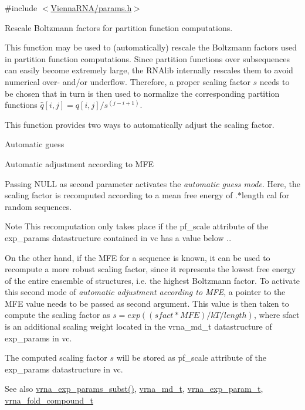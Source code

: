 {\ttfamily \#include $<$\hyperlink{params_8h}{Vienna\+R\+N\+A/params.\+h}$>$}



Rescale Boltzmann factors for partition function computations. 

This function may be used to (automatically) rescale the Boltzmann factors used in partition function computations. Since partition functions over subsequences can easily become extremely large, the R\+N\+Alib internally rescales them to avoid numerical over-\/ and/or underflow. Therefore, a proper scaling factor $s$ needs to be chosen that in turn is then used to normalize the corresponding partition functions $\hat{q}[i,j] = q[i,j] / s^{(j-i+1)}$.

This function provides two ways to automatically adjust the scaling factor.
\begin{DoxyEnumerate}
\item Automatic guess
\item Automatic adjustment according to M\+F\+E
\end{DoxyEnumerate}

Passing {\ttfamily N\+U\+L\+L} as second parameter activates the {\itshape automatic guess mode}. Here, the scaling factor is recomputed according to a mean free energy of {.$\ast$length} cal for random sequences. \begin{DoxyNote}{Note}
This recomputation only takes place if the {\ttfamily pf\+\_\+scale} attribute of the {\ttfamily exp\+\_\+params} datastructure contained in {\ttfamily vc} has a value below {.}.
\end{DoxyNote}
On the other hand, if the M\+F\+E for a sequence is known, it can be used to recompute a more robust scaling factor, since it represents the lowest free energy of the entire ensemble of structures, i.\+e. the highest Boltzmann factor. To activate this second mode of {\itshape automatic adjustment according to M\+F\+E}, a pointer to the M\+F\+E value needs to be passed as second argument. This value is then taken to compute the scaling factor as $ s = exp((sfact * MFE) / kT / length )$, where sfact is an additional scaling weight located in the vrna\+\_\+md\+\_\+t datastructure of {\ttfamily exp\+\_\+params} in {\ttfamily vc}.

The computed scaling factor $s$ will be stored as {\ttfamily pf\+\_\+scale} attribute of the {\ttfamily exp\+\_\+params} datastructure in {\ttfamily vc}.

\begin{DoxySeeAlso}{See also}
\hyperlink{group__energy__parameters_ga8e7ac4fab3b0cc03afbc134eaafb3525}{vrna\+\_\+exp\+\_\+params\+\_\+subst()}, \hyperlink{group__model__details_ga1f8a10e12a0a1915f2a4eff0b28ea17c}{vrna\+\_\+md\+\_\+t}, \hyperlink{group__energy__parameters_ga01d8b92fe734df8d79a6169482c7d8d8}{vrna\+\_\+exp\+\_\+param\+\_\+t}, \hyperlink{group__fold__compound_ga1b0cef17fd40466cef5968eaeeff6166}{vrna\+\_\+fold\+\_\+compound\+\_\+t}
\end{DoxySeeAlso}

